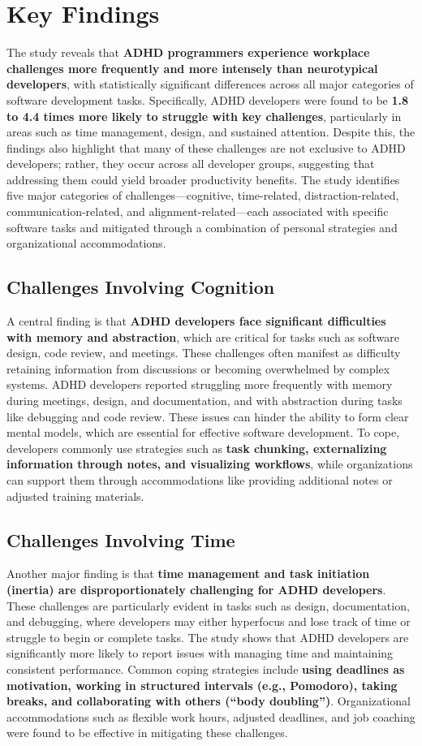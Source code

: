 \section{Key Findings}
The study reveals that \textbf{ADHD programmers experience workplace challenges more frequently and more intensely than neurotypical developers}, with statistically significant differences across all major categories of software development tasks. Specifically, ADHD developers were found to be \textbf{1.8 to 4.4 times more likely to struggle with key challenges}, particularly in areas such as time management, design, and sustained attention. Despite this, the findings also highlight that many of these challenges are not exclusive to ADHD developers; rather, they occur across all developer groups, suggesting that addressing them could yield broader productivity benefits. The study identifies five major categories of challenges—cognitive, time-related, distraction-related, communication-related, and alignment-related—each associated with specific software tasks and mitigated through a combination of personal strategies and organizational accommodations.

\subsection{Challenges Involving Cognition}
A central finding is that \textbf{ADHD developers face significant difficulties with memory and abstraction}, which are critical for tasks such as software design, code review, and meetings. These challenges often manifest as difficulty retaining information from discussions or becoming overwhelmed by complex systems. ADHD developers reported struggling more frequently with memory during meetings, design, and documentation, and with abstraction during tasks like debugging and code review. These issues can hinder the ability to form clear mental models, which are essential for effective software development. To cope, developers commonly use strategies such as \textbf{task chunking, externalizing information through notes, and visualizing workflows}, while organizations can support them through accommodations like providing additional notes or adjusted training materials.

\subsection{Challenges Involving Time}
Another major finding is that \textbf{time management and task initiation (inertia) are disproportionately challenging for ADHD developers}. These challenges are particularly evident in tasks such as design, documentation, and debugging, where developers may either hyperfocus and lose track of time or struggle to begin or complete tasks. The study shows that ADHD developers are significantly more likely to report issues with managing time and maintaining consistent performance. Common coping strategies include \textbf{using deadlines as motivation, working in structured intervals (e.g., Pomodoro), taking breaks, and collaborating with others (“body doubling”)}. Organizational accommodations such as flexible work hours, adjusted deadlines, and job coaching were found to be effective in mitigating these challenges.

